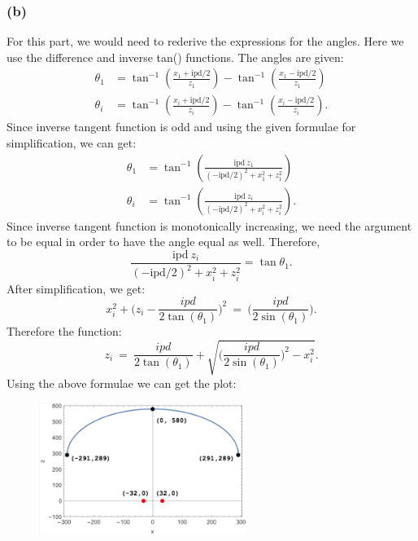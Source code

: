\documentclass[11pt]{article}
\begin{document}
\subsubsection*{(b)}
For this part, we would need to rederive the expressions for the angles. Here we use the difference and inverse tan() functions. The angles are given:
\begin{align}
    \theta_1 &= \tan^{-1}(\frac{x_1+\text{ipd}/2}{z_1}) - \tan^{-1}(\frac{x_1-\text{ipd}/2}{z_1})\\
    \theta_i &= \tan^{-1}(\frac{x_i+\text{ipd}/2}{z_i}) - \tan^{-1}(\frac{x_i-\text{ipd}/2}{z_i}).
\end{align}
Since inverse tangent function is odd and using the given formulae for simplification, we can get:
\begin{align}
    \theta_1 &= \tan^{-1}(\frac{\text{ipd}\ z_1}{(-\text{ipd}/2)^2+x_1^2+z_1^2})\\
    \theta_i &= \tan^{-1}(\frac{\text{ipd}\ z_i}{(-\text{ipd}/2)^2+x_i^2+z_i^2}).
\end{align}
Since inverse tangent function is monotonically increasing, we need the argument to be equal in order to have the angle equal as well. Therefore,
\begin{equation}
    \frac{\text{ipd}\ z_i}{(-\text{ipd}/2)^2+x_i^2+z_i^2}=\tan{\theta_1}.
\end{equation}
After simplification, we get:
\begin{equation}
    x_i^2 + \big(z_i-\frac{ipd}{2\tan(\theta_1)}\big)^2\ =\ \big(\frac{ipd}{2\sin(\theta_1)}\big).
\end{equation}
Therefore the function: 
\begin{equation}
    z_i\ =\ \frac{ipd}{2\tan(\theta_1)} + \sqrt{\Big(\frac{ipd}{2\sin(\theta_1)}\Big)^2-x_i^2}. 
\end{equation}
Using the above formulae we can get the plot:
\begin{figure}[h!t]
    \centering
    \includegraphics[width=0.6\textwidth]{figures/qib.png}
\end{figure}
\end{document}
